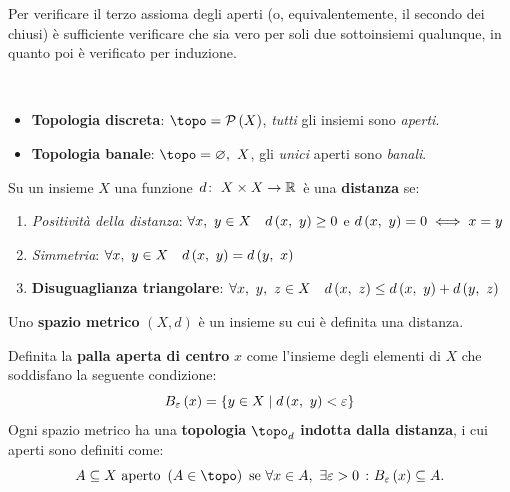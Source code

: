 \begin{observe}
Per verificare il terzo assioma degli aperti (o, equivalentemente, il secondo dei chiusi) è sufficiente verificare che sia vero per soli due sottoinsiemi qualunque, in quanto poi è verificato per induzione.
\end{observe}

\begin{example}~{}
\begin{itemize}
	\item \textbf{Topologia discreta}: $\topo=\setpart{X}$, \textit{tutti} gli insiemi sono \textit{aperti}.
	\item \textbf{Topologia banale}: $\topo={\emptyset,\ X}$, gli \textit{unici} aperti sono \textit{banali}.
\end{itemize}
\end{example}
\begin{define}
Su un insieme $X$ una funzione $\funz{d}{X\times X}{\realset}$ è una \textbf{distanza} se:
\begin{enumerate}
	\item \textit{Positività della distanza}: $\forall x,\ y\in X\quad d\left(x,\ y\right)\geq 0$ e $d\left(x,\ y\right)=0\iff x=y$
	\item \textit{Simmetria}: $\forall x,\ y\in X\quad d\left(x,\ y\right)=d\left(y,\ x\right)$
	\item \textbf{Disuguaglianza triangolare}: $\forall x,\ y,\ z\in X\quad d\left(x,\ z\right)\leq d\left(x,\ y\right)+d\left(y,\ z\right)$
\end{enumerate}
\end{define}
\begin{define}
Uno \textbf{spazio metrico} $\left(X, d\right)$ è un insieme su cui è definita una distanza.
\end{define}
\begin{define}
Definita la \textbf{palla aperta di centro} $x$ come l'insieme degli elementi di $X$ che soddisfano la seguente condizione:
\begin{equation}
	B_{\varepsilon}\left(x\right)=\left\{y\in X\mid d\left(x,\ y\right)<\varepsilon\right\}
\end{equation}
Ogni spazio metrico ha una \textbf{topologia} $\topo_d$ \textbf{indotta dalla distanza}, i cui aperti sono definiti come:
\begin{equation*}
	A\subseteq X \text{ aperto } \left(A\in\topo\right) \text{ se } \forall x\in A,\ \exists \epsilon>0\ \colon B_{\epsilon}\left(x\right)\subseteq A.
\end{equation*}
\end{define}
